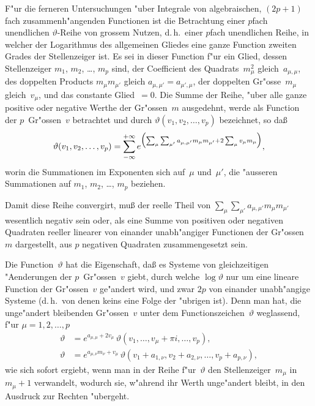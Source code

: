 \documentclass[12pt,a4paper]{article}
\begin{document}
F"ur die ferneren Untersuchungen "uber Integrale von algebraischen,
$(2p+1)$fach zusammenh"angenden Functionen ist die Betrachtung einer
$p$fach unendlichen $\vartheta$-Reihe von grossem Nutzen, d.\,h.\ einer $p$fach
unendlichen Reihe, in welcher der Logarithmus des allgemeinen Gliedes
eine ganze Function zweiten Grades der Stellenzeiger ist. Es sei in
dieser Function f"ur ein Glied, dessen Stellenzeiger $m_1$, $m_2$, \ldots, $m_p$
sind, der Coefficient des Quadrats~$m_\mu^2$ gleich~$a_{\mu,\mu}$, des doppelten
Products $m_\mu m_{\mu'}$ gleich $a_{\mu,\mu'} = a_{\mu',\mu}$, der doppelten Gr"osse~$m_\mu$
gleich~$v_\mu$, und das constante Glied~$= 0$. Die Summe der Reihe, "uber
alle ganze positive oder negative Werthe der Gr"ossen~$m$ ausgedehnt,
werde als Function der $p$~Gr"ossen~$v$ betrachtet und durch
$\vartheta(v_1, v_2, \ldots, v_p)$ bezeichnet, so da\ss{}
\begin{equation}
\label{eq:theta}
\vartheta(v_1, v_2, \ldots, v_p) =
\sum_{-\infty}^{+\infty} e^{\Bigl(\sum_\mu \sum_{\mu'}
  a_{\mu,\mu'} m_\mu m_{\mu'} + 2\sum_\mu v_\mu m_\mu\Bigr)},
\end{equation}
worin die Summationen im Exponenten sich auf~$\mu$ und~$\mu'$, die "ausseren
Summationen auf $m_1$, $m_2$, \ldots, $m_p$ beziehen.

Damit diese Reihe convergirt, mu\ss{} der reelle Theil von
$\sum_\mu \sum_{\mu'} a_{\mu,\mu'} m_\mu m_{\mu'}$ wesentlich negativ sein oder, als eine
Summe von positiven oder negativen Quadraten reeller linearer von einander
unabh"angiger Functionen der Gr"ossen~$m$ dargestellt, aus $p$ negativen
Quadraten zusammengesetzt sein.

Die Function~$\vartheta$ hat die Eigenschaft, da\ss{} es Systeme von
gleichzeitigen "Aenderungen der $p$~Gr"ossen~$v$ giebt, durch welche
$\log\vartheta$ nur um eine lineare Function der Gr"ossen~$v$ ge"andert wird,
und zwar $2p$ von einander unabh"angige Systeme (d.\,h.\ von denen
keins eine Folge der "ubrigen ist). Denn man hat, die unge"andert
bleibenden Gr"ossen~$v$ unter dem Functionszeichen~$\vartheta$ weglassend,
f"ur $\mu = 1, 2, \ldots, p$
\begin{align}
\vartheta &= e^{a_{\mu,\mu} + 2v_\mu}\,
  \vartheta(v_1, \ldots, v_\mu + \pi i, \ldots, v_p),
  \label{eq:theta2}\\
\vartheta &= e^{a_{\mu,\nu}m_\nu + v_\mu}\,
  \vartheta(v_1 + a_{1,\nu}, v_2 + a_{2,\nu}, \ldots, v_p + a_{p,\nu}),
  \label{eq:theta3}
\end{align}
wie sich sofort ergiebt, wenn man in der Reihe f"ur~$\vartheta$ den
Stellenzeiger~$m_\mu$ in $m_\mu + 1$ verwandelt, wodurch sie, w"ahrend ihr
Werth unge"andert bleibt, in den Ausdruck zur Rechten "ubergeht.
\end{document}
